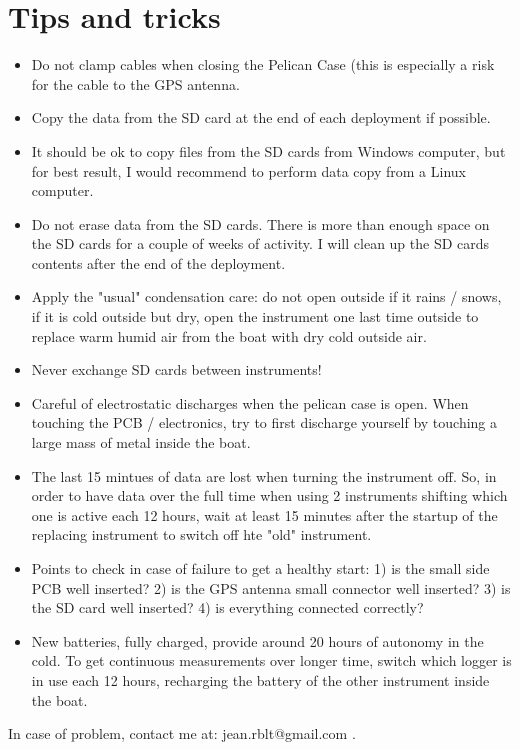 \documentclass[pdftex,a4paper,12pt,twocolumn,fleqn,captions=tableheading]{scrartcl}
\begin{document}
\section{Tips and tricks}

\begin{itemize}
  \item Do not clamp cables when closing the Pelican Case (this is especially a risk for the cable to the GPS antenna.
  \item Copy the data from the SD card at the end of each deployment if possible.
  \item It should be ok to copy files from the SD cards from Windows computer, but for best result, I would recommend to perform data copy from a Linux computer.
  \item Do not erase data from the SD cards. There is more than enough space on the SD cards for a couple of weeks of activity. I will clean up the SD cards contents after the end of the deployment.
  \item Apply the "usual" condensation care: do not open outside if it rains / snows, if it is cold outside but dry, open the instrument one last time outside to replace warm humid air from the boat with dry cold outside air.
  \item Never exchange SD cards between instruments!
  \item Careful of electrostatic discharges when the pelican case is open. When touching the PCB / electronics, try to first discharge yourself by touching a large mass of metal inside the boat.
  \item The last 15 mintues of data are lost when turning the instrument off. So, in order to have data over the full time when using 2 instruments shifting which one is active each 12 hours, wait at least 15 minutes after the startup of the replacing instrument to switch off hte "old" instrument.
  \item Points to check in case of failure to get a healthy start: 1) is the small side PCB well inserted? 2) is the GPS antenna small connector well inserted? 3) is the SD card well inserted? 4) is everything connected correctly?
  \item New batteries, fully charged, provide around 20 hours of autonomy in the cold. To get continuous measurements over longer time, switch which logger is in use each 12 hours, recharging the battery of the other instrument inside the boat.
\end{itemize}

In case of problem, contact me at: jean.rblt@gmail.com .
\end{document}
